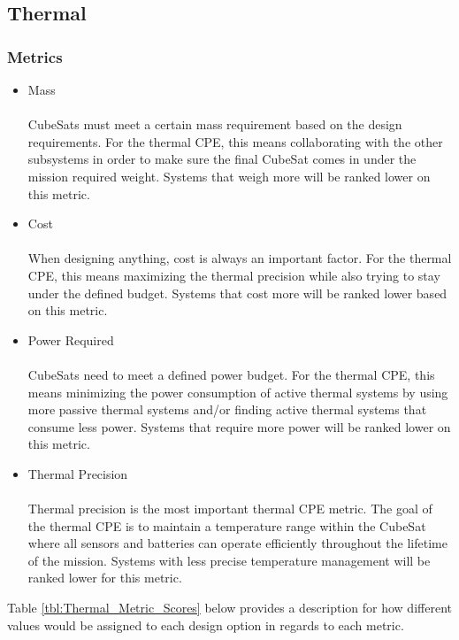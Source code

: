 \subsection{Thermal}
\subsubsection{Metrics}

\begin{itemize}
   \item Mass \\
   \\
CubeSats must meet a certain mass requirement based on the design requirements. For the thermal CPE, this means collaborating with the other subsystems in order to make sure the final CubeSat comes in under the mission required weight. Systems that weigh more will be ranked lower on this metric.
\\
   \item Cost \\
   \\
When designing anything, cost is always an important factor. For the thermal CPE, this means maximizing the thermal precision while also trying to stay under the  defined budget. Systems that cost more will be ranked lower based on this metric.
\\
   \item Power Required \\
   \\
CubeSats need to meet a defined power budget. For the thermal CPE, this means minimizing the power consumption of active thermal systems by using more passive thermal systems and/or finding active thermal systems that consume less power. Systems that require more power will be ranked lower on this metric.
\\
   \item Thermal Precision \\
   \\
Thermal precision is the most important thermal CPE metric. The goal of the thermal CPE is to maintain a temperature range within the CubeSat where all sensors and batteries can operate efficiently throughout the lifetime of the mission. Systems with less precise temperature management will be ranked lower for this metric.
\end{itemize}

Table \ref{tbl:Thermal_Metric_Scores} below provides a description for how different values would be assigned to each design option in regards to each metric. 

